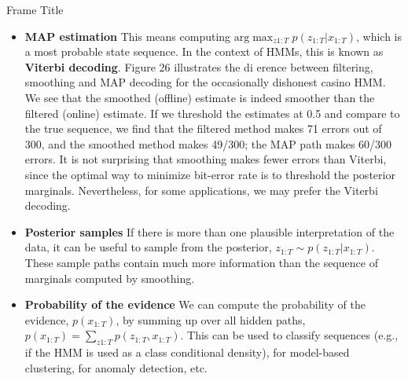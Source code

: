 \documentclass[10pt,mathserif]{beamer}
\begin{document}
\begin{frame}{Frame Title}
\begin{itemize}
    \item \textbf{MAP estimation} This means computing $\text{arg}\max_{z1:T} p(z_{1:T} |x_{1:T})$, which is a most probable state sequence. In the context of HMMs, this is known as \textbf{Viterbi decoding}. Figure 26 illustrates the di erence between filtering, smoothing and MAP decoding for the occasionally dishonest casino HMM. We see that the smoothed (offline) estimate is indeed smoother than the filtered (online) estimate. If we threshold the estimates at 0.5 and compare to the true sequence, we find that the filtered method makes 71 errors out of 300, and the smoothed method makes 49/300; the MAP path makes 60/300 errors. It is not surprising that smoothing makes fewer errors than Viterbi, since the optimal way to minimize bit-error rate is to threshold the posterior marginals. Nevertheless, for some applications, we may prefer the Viterbi decoding.
    \item \textbf{Posterior samples} If there is more than one plausible interpretation of the data, it can be useful to sample from the posterior, $z_{1:T} \sim p(z_{1:T} |x_{1:T})$. These sample paths contain much more information than the sequence of marginals computed by smoothing.
    \item \textbf{Probability of the evidence} We can compute the probability of the evidence, $p(x_{1:T})$, by summing up over all hidden paths, $p(x_{1:T}) = \sum_{z1:T} p(z_{1:T}, x_{1:T})$. This can be used to classify sequences (e.g., if the HMM is used as a class conditional density), for model-based clustering, for anomaly detection, etc. 
\end{itemize}
\end{frame}
\end{document}
